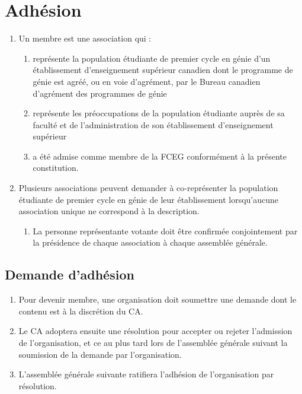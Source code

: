 \section{Adhésion}
\label{adhesion}

\begin{enumerate}
 \item Un membre est une association qui :
  \begin{enumerate}
   \item représente la population étudiante de premier cycle en génie d'un établissement d'enseignement supérieur canadien dont le programme de génie est agréé, ou en voie d'agrément, par le Bureau canadien d'agrément des programmes de génie
   \item représente les préoccupations de la population étudiante auprès de sa faculté et de l'administration de son établissement d'enseignement supérieur
   \item a été admise comme membre de la FCEG conformément à la présente constitution.
  \end{enumerate}
 \item Plusieurs associations peuvent demander à co-représenter la population étudiante de premier cycle en génie de leur établissement lorsqu'aucune association unique ne correspond à la description.
  \begin{enumerate}
   \item La personne représentante votante doit être confirmée conjointement par la présidence de chaque association à chaque assemblée générale.
  \end{enumerate}
\end{enumerate}

\subsection{Demande d'adhésion}
\label{adhesion-demande-d-adhesion}

\begin{enumerate}
 \item Pour devenir membre, une organisation doit soumettre une demande dont le contenu est à la discrétion du CA.
 \item Le CA adoptera ensuite une résolution pour accepter ou rejeter l'admission de l'organisation, et ce au plus tard lors de l'assemblée générale suivant la soumission de la demande par l'organisation.
 \item L’assemblée générale suivante ratifiera l’adhésion de l’organisation par résolution.
\end{enumerate}
